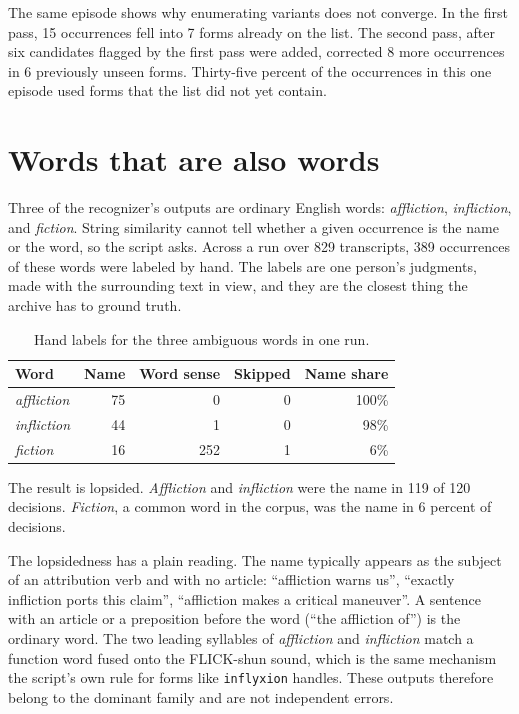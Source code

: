 \documentclass[11pt]{article}
\begin{document}
The same episode shows why enumerating variants does not converge. In the first pass, 15 occurrences fell into 7 forms already on the list. The second pass, after six candidates flagged by the first pass were added, corrected 8 more occurrences in 6 previously unseen forms. Thirty-five percent of the occurrences in this one episode used forms that the list did not yet contain.


\section{Words that are also words}
\label{sec:labels}

Three of the recognizer's outputs are ordinary English words: \emph{affliction}, \emph{infliction}, and \emph{fiction}. String similarity cannot tell whether a given occurrence is the name or the word, so the script asks. Across a run over 829 transcripts, 389 occurrences of these words were labeled by hand. The labels are one person's judgments, made with the surrounding text in view, and they are the closest thing the archive has to ground truth.

\begin{table}[h]
\centering
\begin{tabular}{lrrrr}
\toprule
Word & Name & Word sense & Skipped & Name share \\
\midrule
\emph{affliction} & 75 & 0 & 0 & 100\% \\
\emph{infliction} & 44 & 1 & 0 & 98\% \\
\emph{fiction} & 16 & 252 & 1 & 6\% \\
\bottomrule
\end{tabular}
\caption{Hand labels for the three ambiguous words in one run.}
\end{table}

The result is lopsided. \emph{Affliction} and \emph{infliction} were the name in 119 of 120 decisions. \emph{Fiction}, a common word in the corpus, was the name in 6 percent of decisions.

The lopsidedness has a plain reading. The name typically appears as the subject of an attribution verb and with no article: ``affliction warns us'', ``exactly infliction ports this claim'', ``affliction makes a critical maneuver''. A sentence with an article or a preposition before the word (``the affliction of'') is the ordinary word. The two leading syllables of \emph{affliction} and \emph{infliction} match a function word fused onto the FLICK-shun sound, which is the same mechanism the script's own rule for forms like \texttt{inflyxion} handles. These outputs therefore belong to the dominant family and are not independent errors.
\end{document}
